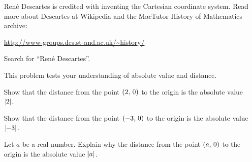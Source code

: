 \documentclass[a4paper,oneside,12pt]{article}
\begin{document}
\begin{problem}
\item Ren\'e Descartes is credited with inventing the Cartesian
  coordinate system.  Read more about Descartes at Wikipedia and the
  MacTutor History of Mathematics archive:
  \begin{center}
  \url{http://www-groups.dcs.st-and.ac.uk/~history/}
  \end{center}
  Search for ``Ren\'e Descartes''.

\item\label{prob:absolute_value_distance_on_x_axis}
  This problem tests your understanding of absolute value and
  distance.
  \begin{packedenum}
  \item\label{subprob:point_on_axis_to_origin_2}
    Show that the distance from the point $\left\lparen{2},\, {0}\right\rparen$ to the origin
    is the absolute value $\lvert2\rvert$.

  \item\label{subprob:point_on_axis_to_origin_minus_3}
    Show that the distance from the point $\left\lparen{-3},\, {0}\right\rparen$ to the
    origin is the absolute value $\lvert-3\rvert$.

  \item\label{subprob:point_on_axis_to_origin_general}
    Let $a$ be a real number.  Explain why the distance from the point
    $\left\lparen{a},\, {0}\right\rparen$ to the origin is the absolute value
    $\lvert a\rvert$.
  \end{packedenum}
\end{problem}
\end{document}
